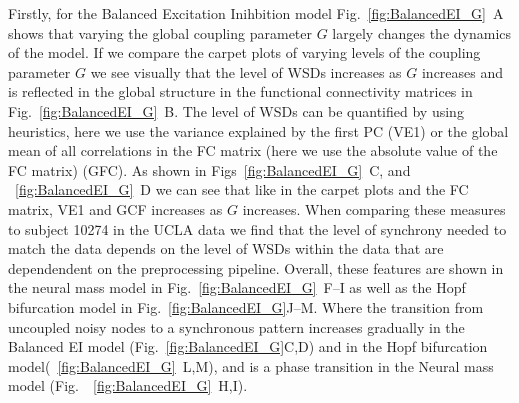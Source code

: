 \documentclass[oneside]{zHenriquesLab-StyleBioRxiv}
\begin{document}
Firstly, for the Balanced Excitation Inihbition model Fig.~\ref{fig:BalancedEI_G}~A shows that varying the global coupling parameter $G$ largely changes the dynamics of the model. If we compare the carpet plots of varying levels of the coupling parameter $G$ we see visually that the level of WSDs increases as $G$ increases and is reflected in the global structure in the functional connectivity matrices in Fig.~\ref{fig:BalancedEI_G}~B. The level of WSDs can be quantified by using heuristics, here we use the variance explained by the first PC (VE1) or the global mean of all correlations in the FC matrix (here we use the absolute value of the FC matrix) (GFC). As shown in Figs~\ref{fig:BalancedEI_G}~C, and ~\ref{fig:BalancedEI_G}~D we can see that like in the carpet plots and the FC matrix, VE1 and GCF increases as $G$ increases. When comparing these measures to subject 10274 in the UCLA data we find that the level of synchrony needed to match the data depends on the level of WSDs within the data that are dependendent on the preprocessing pipeline. Overall, these features are shown in the neural mass model in Fig.~\ref{fig:BalancedEI_G}~F--I as well as the Hopf bifurcation model in Fig.~\ref{fig:BalancedEI_G}J--M. Where the transition from uncoupled noisy nodes to a synchronous pattern increases gradually in the Balanced EI model (Fig.~\ref{fig:BalancedEI_G}C,D) and in the Hopf bifurcation model(~\ref{fig:BalancedEI_G}~L,M), and is a phase transition in the Neural mass model (Fig.~~\ref{fig:BalancedEI_G}~H,I).
\end{document}

